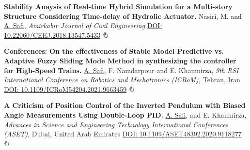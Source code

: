 \documentclass[letterpaper,MMMyyyy]{CVTemplate}
\begin{document}
\begin{Body}
\Gap\vspace{6pt}
\BulletItem
\textbf{Stability Anaysis of Real-time Hybrid Simulation for a Multi-story Structure Considering Time-delay of Hydrolic Actuator.}
Nasiri, M. and \underline{A. Safi},
\textit{Amirkabir Journal of Civil Engineering}
\newline
\href{https://ceej.aut.ac.ir/article_2911.html?lang=en}{DOI: \textcolor{Forestg}{10.22060/CEEJ.2018.13547.5433}} \includegraphics[height=9pt]{icons/hand-cursor.png}
\hfill
\textcolor{OrangeY}{}
\Gap
\endgroup


\begingroup
\BigGap
\textcolor{Forestg}{\textbf{Conferences:}}
\vspace{4pt}
\BulletItem
\textbf{On the effectiveness of Stable Model Predictive vs. Adaptive Fuzzy Sliding Mode Method in synthesizing the controller for High-Speed Trains.}
\underline{A. Safi}, F. Namdarpour and E. Khanmirza,
\textit{9th RSI International Conference on Robotics and Mechatronics (ICRoM),} Tehran, Iran
\newline
\href{https://ieeexplore.ieee.org/document/9663459}{DOI: \textcolor{Forestg}{10.1109/ICRoM54204.2021.9663459}}
\includegraphics[height=9pt]{icons/hand-cursor.png}
\hfill
\textcolor{OrangeY}{}


\Gap\vspace{6pt}
\BulletItem
\textbf{A Criticism of Position Control of the Inverted Pendulum with Biased Angle Measurements Using Double-Loop PID.}
\underline{A. Safi}, and E. Khanmirza,
\textit{Advances in Science and Engineering Technology International Conferences (ASET)}, Dubai, United Arab Emirates
\newline
\href{https://ieeexplore.ieee.org/document/9118277}{DOI: \textcolor{Forestg}{10.1109/ASET48392.2020.9118277}}
\includegraphics[height=9pt]{icons/hand-cursor.png}
\hfill
\textcolor{OrangeY}{}



\Gap
\endgroup





\end{Body}
\end{document}
